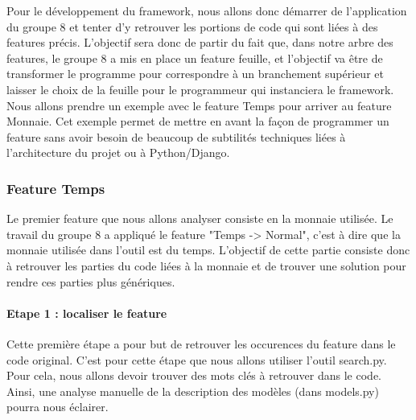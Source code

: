 Pour le développement du framework,  nous allons donc démarrer de l'application du groupe 8 et tenter d'y retrouver les portions de code qui sont liées à des features précis.  L'objectif sera donc de partir du fait que,  dans notre arbre des features,  le groupe 8 a mis en place un feature feuille,  et l'objectif va être de transformer le programme pour correspondre à un branchement supérieur et laisser le choix de la feuille pour le programmeur qui instanciera le framework.  Nous allons prendre un exemple avec le feature Temps pour arriver au feature Monnaie.  Cet exemple permet de mettre en avant la façon de programmer un feature sans avoir besoin de beaucoup de subtilités techniques liées à l'architecture du projet ou à Python/Django.

\subsubsection{Feature Temps}

Le premier feature que nous allons analyser consiste en la monnaie utilisée.  Le travail du groupe 8 a appliqué le feature "Temps -> Normal",  c'est à dire que la monnaie utilisée dans l'outil est du temps.  L'objectif de cette partie consiste donc à retrouver les parties du code liées à la monnaie et de trouver une solution pour rendre ces parties plus génériques.

\paragraph{Etape 1 : localiser le feature}

Cette première étape a pour but de retrouver les occurences du feature dans le code original.  C'est pour cette étape que nous allons utiliser l'outil search.py.  Pour cela,  nous allons devoir trouver des mots clés à retrouver dans le code.  Ainsi,  une analyse manuelle de la description des modèles (dans models.py) pourra nous éclairer.

